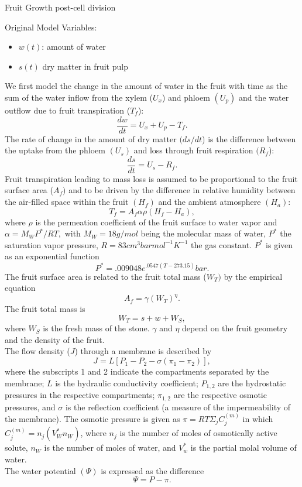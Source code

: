 \begin{section}{Fruit Growth post-cell division}
\begin{subsection}{Original Model}
Variables:\\
\begin{itemize}
\item $w(t)$: amount of water
\item $s(t)$ dry matter in fruit pulp
\end{itemize}
We first model the change in the amount of water in the fruit with time as the sum of the water inflow from the xylem ($U_x$) and phloem $(U_p)$ and the water outflow due to fruit transpiration ($T_f$):
\begin{equation}
\frac{dw}{dt}=U_x+U_p-T_f.
\end{equation}
The rate of change in the amount of dry matter $(ds/dt$) is the difference between the uptake from the phloem $(U_s)$ and loss through fruit respiration $(R_f$):
\begin{equation}
\frac{ds}{dt}=U_s-R_f.
\end{equation}
Fruit transpiration leading to mass loss is assumed to be proportional to the fruit surface area ($A_f)$ and to be driven by the difference in relative humidity between the air-filled space within the fruit $(H_f)$ and the ambient atmosphere $(H_a)$:
\begin{equation}
T_f=A_f\alpha\rho(H_f-H_a),
\end{equation}
where $\rho$ is the permeation coefficient of the fruit surface to water vapor and $\alpha=M_W P^*/RT,$ with $M_W=18g/mol$ being the molecular mass of water, $P^*$ the saturation vapor pressure, $R=83cm^3bar mol^{-1}K^{-1}$ the gas constant. $P^*$ is given as an exponential function
$$P^*=.009048e^{.0547(T-273.15)} bar.$$
The fruit surface area is related to the fruit total mass ($W_T)$ by the empirical equation
\begin{equation}
A_f=\gamma(W_T)^\eta.
\end{equation}
The fruit total mass is
$$W_T=s+w+W_S,$$
where $W_S$ is the fresh mass of the stone. $\gamma$ and $\eta$ depend on the fruit geometry and the density of the fruit. \\

The flow density ($J$) through a membrane is described by
\begin{equation}
J=L[P_1-P_2-\sigma(\pi_1-\pi_2)],
\end{equation}
where the subscripts 1 and 2 indicate the compartments separated by the membrane; $L$ is the hydraulic conductivity coefficient; $P_{1,2}$ are the hydrostatic pressures in the respective compartments; $\pi_{1,2}$ are the respective osmotic pressures, and $\sigma$ is the reflection coefficient (a measure of the impermeability of the membrane). The osmotic pressure is given as $\pi=RT\Sigma_jC_j^{(m)}$ in which $C_j^{(m)}=n_j(V_W^*n_W)$, where $n_j$ is the number of moles of osmotically active solute, $n_W$ is the number of moles of water, and $V_w^*$ is the partial molal volume of water. \\
The water potential $(\Psi)$ is expressed as the difference
$$\Psi=P-\pi.$$


\end{subsection}
\end{section}
